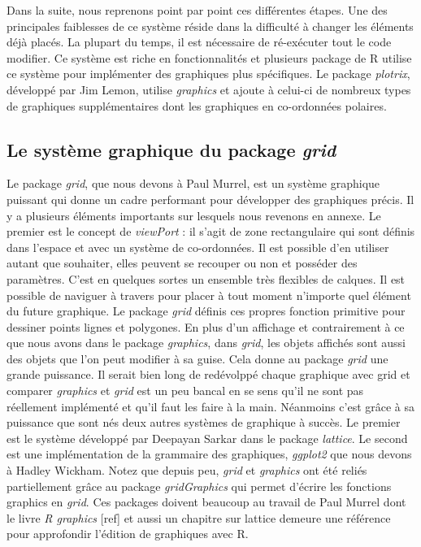 \documentclass[]{article}
\begin{document}
Dans la suite, nous reprenons point par point ces différentes étapes. Une des
principales faiblesses de ce système réside dans la difficulté à changer les
éléments déjà placés. La plupart du temps, il est nécessaire de ré-exécuter tout
le code modifier. Ce système est riche en fonctionnalités et plusieurs package
de R utilise ce système pour implémenter des graphiques plus spécifiques. Le
package \emph{plotrix}, développé par Jim Lemon, utilise \emph{graphics} et ajoute à
celui-ci de nombreux types de graphiques supplémentaires dont les graphiques en
co-ordonnées polaires.

\hypertarget{le-systuxe8me-graphique-du-package-grid}{%
\subsection{\texorpdfstring{Le système graphique du package \emph{grid}}{Le système graphique du package grid}}\label{le-systuxe8me-graphique-du-package-grid}}

Le package \emph{grid}, que nous devons à Paul Murrel, est un système graphique puissant qui donne un cadre performant pour développer des graphiques précis. Il y a plusieurs éléments importants sur lesquels nous revenons en annexe. Le premier est le concept de \emph{viewPort} : il s'agit de zone rectangulaire qui sont définis dans l'espace et avec un système de co-ordonnées. Il est possible d'en utiliser autant que souhaiter, elles peuvent se recouper ou non et posséder des paramètres. C'est en quelques sortes un ensemble très flexibles de calques. Il est possible de naviguer à travers pour placer à tout moment n'importe quel élément du future graphique. Le package \emph{grid} définis ces propres fonction primitive pour dessiner points lignes et polygones. En plus d'un affichage et contrairement à ce que nous avons dans le package \emph{graphics}, dans \emph{grid}, les objets affichés sont aussi des objets que l'on peut modifier à sa guise. Cela donne au package \emph{grid} une grande puissance. Il serait bien long de redévolppé chaque graphique avec grid et comparer \emph{graphics} et \emph{grid} est un peu bancal en se sens qu'il ne sont pas réellement implémenté et qu'il faut les faire à la main. Néanmoins c'est grâce à sa puissance que sont nés deux autres systèmes de graphique à succès. Le premier est le système développé par Deepayan Sarkar dans le package \emph{lattice}. Le second est une implémentation de la grammaire des graphiques, \emph{ggplot2} que nous devons à Hadley Wickham. Notez que depuis peu, \emph{grid} et \emph{graphics} ont été reliés partiellement grâce au package \emph{gridGraphics} qui permet d'écrire les fonctions graphics en \emph{grid}.
Ces packages doivent beaucoup au travail de Paul Murrel dont le livre \emph{R graphics} {[}ref{]} et aussi un chapitre sur lattice demeure une référence pour approfondir l'édition de graphiques avec R.
\end{document}
